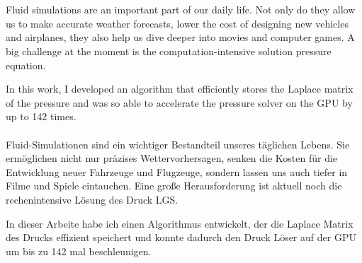 \chapter{\abstractname}
Fluid simulations are an important part of our daily life. Not only do they allow us to make accurate weather forecasts, lower the cost of designing new vehicles and airplanes, they also help us dive deeper into movies and computer games. A big challenge at the moment is the computation-intensive solution pressure equation. 
\par In this work, I developed an algorithm that efficiently stores the Laplace matrix of the pressure and was so able to accelerate the pressure solver on the GPU by up to 142 times. \\\\

Fluid-Simulationen sind ein wichtiger Bestandteil unseres täglichen Lebens. Sie ermöglichen nicht nur präzises Wettervorhersagen, senken die Kosten für die Entwicklung neuer Fahrzeuge und Flugzeuge, sondern lassen uns auch tiefer in Filme und Spiele eintauchen. Eine große Herausforderung ist aktuell noch die rechenintensive Lösung des Druck LGS. 
\par In dieser Arbeite habe ich einen Algorithmus entwickelt, der die Laplace Matrix des Drucks effizient speichert und konnte dadurch den Druck Löser auf der GPU um bis zu 142 mal beschleunigen. 
